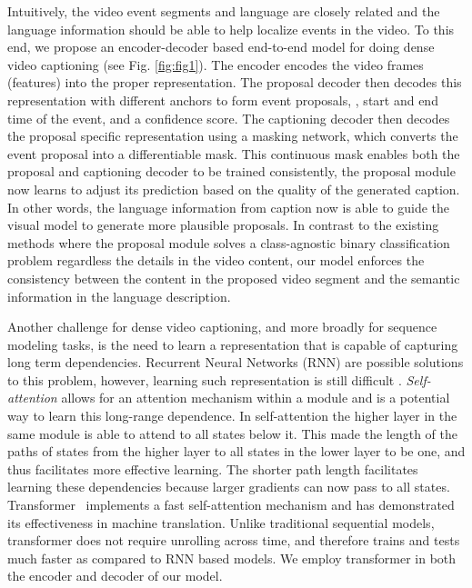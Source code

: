 \documentclass[10pt,twocolumn,letterpaper]{article}
\begin{document}
Intuitively, the video event segments and language are closely related and the language information should be able to help localize events in the video. 
To this end, we propose an encoder-decoder based end-to-end model for doing dense video captioning (see Fig. \ref{fig:fig1}). The encoder encodes the video frames (features) into the proper representation. The proposal decoder then decodes this representation with different anchors to form event proposals, \ie, start and end time of the event, and a confidence score. The captioning decoder then decodes the proposal specific representation using a masking network, which converts the event proposal into a differentiable mask. This continuous mask enables both the proposal and captioning decoder to be trained consistently, \ie the proposal module now learns to adjust its prediction based on the quality of the generated caption. In other words, the language information from caption now is able to guide the visual model to generate more plausible proposals.
In contrast to the existing methods where the proposal module solves a class-agnostic binary classification problem regardless the details in the video content, our model enforces the consistency between the content in the proposed video segment and the semantic information in the language description.

Another challenge for dense video captioning, and more broadly for sequence modeling tasks, is the need to learn a representation that is capable of capturing long term dependencies. Recurrent Neural Networks (RNN) are possible solutions to this problem, however, learning such representation is still difficult \cite{pascanu2013difficulty}. \emph{Self-attention} \cite{lin2017structured,paulus2017deep,vaswani2017attention} allows for an attention mechanism within a module and is a potential way to learn this long-range dependence. In self-attention the higher layer in the same module is able to attend to all states below it. This made the length of the paths of states from the higher layer to all states in the lower layer to be one, and thus facilitates more effective learning. The shorter path length facilitates learning these dependencies because larger gradients can now pass to all states. Transformer~\cite{vaswani2017attention} implements a fast self-attention mechanism and has demonstrated its effectiveness in machine translation. Unlike traditional sequential models, transformer does not require unrolling across time, and therefore trains and tests much faster as compared to RNN based models. We employ transformer in both the encoder and decoder of our model.
\end{document}
